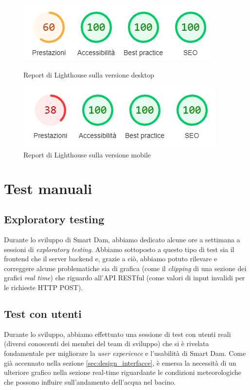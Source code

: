 \documentclass[a4paper,12pt]{report}
\begin{document}
\begin{figure}
	\centering
	\begin{minipage}{0.45\textwidth}
		\includegraphics[scale=0.7]{lighthouse_report_desktop}
		\caption{Report di Lighthouse sulla versione desktop}
		\label{fig:lighthouse_report_desktop}
	\end{minipage}
	\hfill
	\begin{minipage}{0.45\textwidth}
		\includegraphics[scale=0.7]{lighthouse_report_mobile}
		\caption{Report di Lighthouse sulla versione mobile}
		\label{fig:lighthouse_report_mobile}
	\end{minipage}
\end{figure}

\section{Test manuali}
\subsection{Exploratory testing}
Durante lo sviluppo di Smart Dam, abbiamo dedicato alcune ore a settimana a sessioni di \emph{exploratory testing}. Abbiamo sottoposto a questo tipo di test sia il frontend che il server backend e, grazie a ciò, abbiamo potuto rilevare e correggere alcune problematiche sia di grafica (come il \emph{clipping} di una sezione dei grafici \emph{real time}) che riguardo all'API RESTful (come valori di input invalidi per le richieste HTTP POST).

\subsection{Test con utenti}
Durante lo sviluppo, abbiamo effettuato una sessione di test con utenti reali (diversi conoscenti dei membri del team di sviluppo) che si è rivelata fondamentale per migliorare la \emph{user experience} e l'usabilità di Smart Dam. Come già accennato nella sezione \ref{sec:design_interfacce}, è emersa la necessità di un ulteriore grafico nella sezione real-time riguardante le condizioni meteorologiche che possono influire sull'andamento dell'acqua nel bacino.
\end{document}
